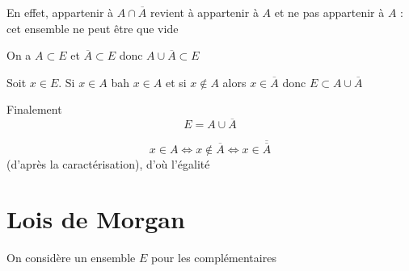 \newline

\begin{preuve}
En effet, appartenir à $A \cap \overline{A}$ revient à appartenir à $A$ et ne pas appartenir à $A$ : cet ensemble ne peut être que vide
\end{preuve}

\newline

\begin{preuve}
On a $A \subset E$ et $\overline{A} \subset E$ donc $A\cup \overline{A} \subset E$\newline

Soit $x\in E$. Si $x\in A$ bah $x\in A$ et si $x\notin A$ alors $x\in \overline{A}$ donc $E \subset A\cup \overline{A}$\newline

Finalement $$E = A \cup \overline{A}$$
\end{preuve}

\newline

\begin{preuve}
$$x\in A \Leftrightarrow x \notin \overline{A} \Leftrightarrow x \in \overline{\overline{A}}$$
(d'après la caractérisation), d'où l'égalité
\end{preuve}
\section{Lois de Morgan}
On considère un ensemble $E$ pour les complémentaires \newline


\newline

